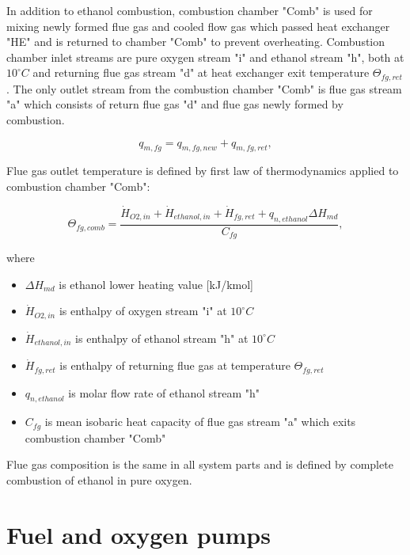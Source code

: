 \documentclass{article}
\begin{document}
	In addition to ethanol combustion, combustion chamber "Comb" is used for mixing newly formed flue gas and cooled flow gas which passed heat exchanger "HE" and is returned to chamber "Comb" to prevent overheating. Combustion chamber inlet streams are pure oxygen stream "i" and ethanol stream "h", both at $10^{\circ}C$ and returning flue gas stream "d" at heat exchanger exit temperature  $\Theta_{fg,ret}$. The only outlet stream from the combustion chamber "Comb" is flue gas stream "a" which consists of return flue gas "d" and flue gas newly formed by combustion. 
	
	\begin{equation}\label{eq:flue_gas_stream_new}
		q_{m,fg} = q_{m,fg,new} + q_{m,fg,ret},
	\end{equation}
	
	\noindent
	Flue gas outlet temperature is defined by first law of thermodynamics applied to combustion chamber "Comb":
	
	\begin{equation}\label{eq:flue_gas_out_temp}
		\Theta_{fg,comb} = \frac{\dot{H}_{O2,in} + \dot{H}_{ethanol,in} +\dot{H}_{fg,ret} + q_{n,ethanol} \Delta H_{md}}{C_{fg}},
	\end{equation}
	
	\noindent
	where
	
	\begin{itemize}
		\item $\Delta H_{md}$ is ethanol lower heating value [kJ/kmol]
		\item $\dot{H}_{O2,in}$ is enthalpy of oxygen stream "i" at $10^\circ C$
		\item $\dot{H}_{ethanol,in}$ is enthalpy of ethanol stream "h" at $10^\circ C$
		\item $\dot{H}_{fg,ret}$ is enthalpy of returning flue gas at temperature $\Theta_{fg,ret}$
		\item $q_{n,ethanol}$ is molar flow rate of ethanol stream "h"
		\item $C_{fg}$ is mean isobaric heat capacity of flue gas stream "a" which exits combustion chamber "Comb"
	\end{itemize}

	\noindent
	Flue gas composition is the same in all system parts and is defined by complete combustion of ethanol in pure oxygen.
	
	\section{Fuel and oxygen pumps}
	
\end{document}
